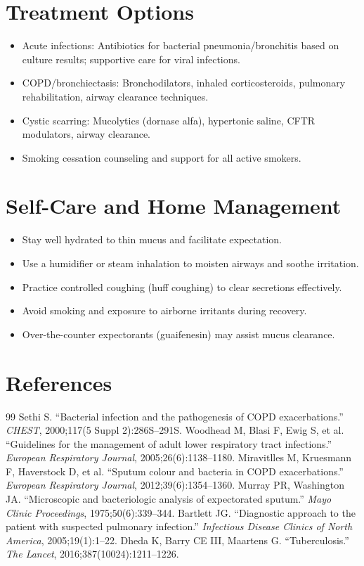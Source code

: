 \section*{Treatment Options}
\begin{itemize}
  \item Acute infections: Antibiotics for bacterial pneumonia/bronchitis based on culture results; supportive care for viral infections.
  \item COPD/bronchiectasis: Bronchodilators, inhaled corticosteroids, pulmonary rehabilitation, airway clearance techniques.
  \item Cystic scarring: Mucolytics (dornase alfa), hypertonic saline, CFTR modulators, airway clearance.
  \item Smoking cessation counseling and support for all active smokers.
\end{itemize}

\section*{Self-Care and Home Management}
\begin{itemize}
  \item Stay well hydrated to thin mucus and facilitate expectation.
  \item Use a humidifier or steam inhalation to moisten airways and soothe irritation.
  \item Practice controlled coughing (huff coughing) to clear secretions effectively.
  \item Avoid smoking and exposure to airborne irritants during recovery.
  \item Over-the-counter expectorants (guaifenesin) may assist mucus clearance.
\end{itemize}

\section*{References}
\begin{thebibliography}{99}
 Sethi S. ``Bacterial infection and the pathogenesis of COPD exacerbations.'' \textit{CHEST}, 2000;117(5 Suppl 2):286S--291S.
 Woodhead M, Blasi F, Ewig S, et al. ``Guidelines for the management of adult lower respiratory tract infections.'' \textit{European Respiratory Journal}, 2005;26(6):1138--1180.
 Miravitlles M, Kruesmann F, Haverstock D, et al. ``Sputum colour and bacteria in COPD exacerbations.'' \textit{European Respiratory Journal}, 2012;39(6):1354--1360.
 Murray PR, Washington JA. ``Microscopic and bacteriologic analysis of expectorated sputum.'' \textit{Mayo Clinic Proceedings}, 1975;50(6):339--344.
 Bartlett JG. ``Diagnostic approach to the patient with suspected pulmonary infection.'' \textit{Infectious Disease Clinics of North America}, 2005;19(1):1--22.
 Dheda K, Barry CE III, Maartens G. ``Tuberculosis.'' \textit{The Lancet}, 2016;387(10024):1211--1226.
\end{thebibliography}
